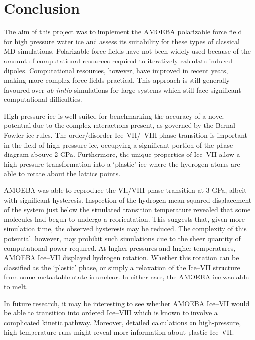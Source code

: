 \section{Conclusion}

The aim of this project was to implement the AMOEBA polarizable force field for high pressure 
water ice and assess its suitability for these types of classical MD simulations.
Polarizable force fields have not been widely used because of the amount of computational 
resources required to iteratively calculate induced dipoles.
Computational resources, however, have improved in recent years, making more complex 
force fields practical.
This approach is still generally favoured over \textit{ab initio} simulations for 
large systems which still face significant computational difficulties.

\par
High-pressure ice is well suited for benchmarking the accuracy of a novel potential 
due to the complex interactions present, as governed by the Bernal-Fowler ice rules.
The order/disorder Ice--VII/--VIII phase transition is important in the field of high-pressure
ice, occupying a significant portion of the phase diagram abouve 2 GPa.
Furthermore, the unique properties of Ice--VII allow a high-pressure transformation into
a `plastic' ice where the hydrogen atoms are able to rotate about the lattice points.

\par
AMOEBA was able to reproduce the VII/VIII phase transition at 3 GPa, albeit with
significant hysteresis.
Inspection of the hydrogen mean-squared displacement of the system just below
the simulated transition temperature revealed that some molecules had
begun to undergo a reorientation.
This suggests that, given more simulation time, the observed hysteresis may be
reduced.
The complexity of this potential, however, may prohibit such simulations due to the 
sheer quantity of computational power required.
At higher pressures and higher temperatures, AMOEBA Ice--VII displayed hydrogen rotation.
Whether this rotation can be classified as the `plastic' phase, or simply a relaxation of 
the Ice--VII structure from some metastable state is unclear.
In either case, the AMOEBA ice was able to melt.

\par
In future research, it may be interesting to see whether AMOEBA Ice--VII would be able to 
transition into ordered Ice--VIII which is known to involve a complicated kinetic pathway.
Moreover, detailed calculations on high-pressure, high-temperature runs might reveal more
information about plastic Ice--VII.
